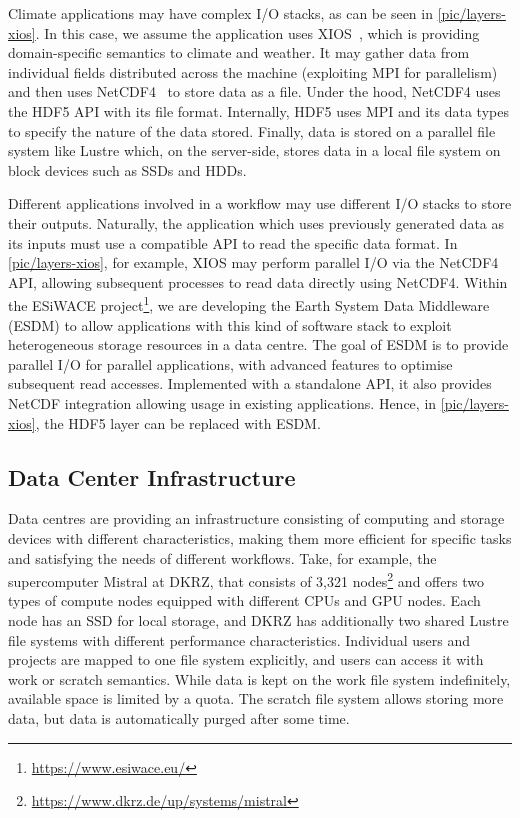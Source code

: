 \documentclass{superfri}
\begin{document}
Climate applications may have complex I/O stacks, as can be seen in \cref{pic/layers-xios}.
In this case, we assume the application uses XIOS~\cite{xios}, which is providing domain-specific semantics to climate and weather.
It may gather data from individual fields distributed across the machine (exploiting MPI for parallelism) and then uses NetCDF4~\cite{netcdf} to store data as a file.
Under the hood, NetCDF4 uses the HDF5 API with its file format.
Internally, HDF5 uses MPI and its data types to specify the nature of the data stored.
Finally, data is stored on a parallel file system like Lustre which, on the server-side, stores data in a local file system on block devices such as SSDs and HDDs.

Different applications involved in a workflow may use different I/O stacks to store their outputs.
Naturally, the application which uses previously generated data as its inputs must use a compatible API to read the specific data format.
In \cref{pic/layers-xios}, for example, XIOS may perform parallel I/O via the NetCDF4 API, allowing subsequent processes to read data directly using NetCDF4.
Within the ESiWACE project\footnote{\url{https://www.esiwace.eu/}}, we are developing the Earth System Data Middleware (ESDM)\cite{esdm} to allow applications with this kind of software stack to exploit heterogeneous storage resources in a data centre.
The goal of ESDM is to provide parallel I/O for parallel applications, with advanced features to optimise subsequent read accesses.
Implemented with a standalone API, it also provides NetCDF integration allowing usage in existing applications.
Hence, in \cref{pic/layers-xios}, the HDF5 layer can be replaced with ESDM.

\subsection{Data Center Infrastructure}

Data centres are providing an infrastructure consisting of computing and storage devices with different characteristics, making them more efficient for specific tasks and satisfying the needs of different workflows.
Take, for example, the supercomputer Mistral at DKRZ, that consists of 3,321 nodes\footnote{\url{https://www.dkrz.de/up/systems/mistral}} and offers two types of compute nodes equipped with different CPUs and GPU nodes.
Each node has an SSD for local storage, and DKRZ has additionally two shared Lustre file systems with different performance characteristics.
Individual users and projects are mapped to one file system explicitly, and users can access it with work or scratch semantics.
While data is kept on the work file system indefinitely, available space is limited by a quota.
The scratch file system allows storing more data, but data is automatically purged after some time.
\end{document}
